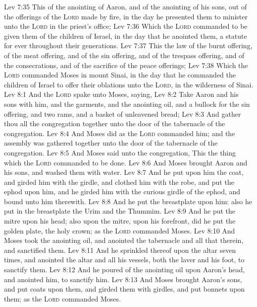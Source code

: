\vs Lev 7:35 This  of the anointing of Aaron, and of the anointing of his sons, out of the offerings of the \textsc{Lord} made by fire, in the day  he presented them to minister unto the \textsc{Lord} in the priest's office;
\vs Lev 7:36 Which the \textsc{Lord} commanded to be given them of the children of Israel, in the day that he anointed them,  a statute for ever throughout their generations.
\vs Lev 7:37 This  the law of the burnt offering, of the meat offering, and of the sin offering, and of the trespass offering, and of the consecrations, and of the sacrifice of the peace offerings;
\vs Lev 7:38 Which the \textsc{Lord} commanded Moses in mount Sinai, in the day that he commanded the children of Israel to offer their oblations unto the \textsc{Lord}, in the wilderness of Sinai.
\vs Lev 8:1 And the \textsc{Lord} spake unto Moses, saying,
\vs Lev 8:2 Take Aaron and his sons with him, and the garments, and the anointing oil, and a bullock for the sin offering, and two rams, and a basket of unleavened bread;
\vs Lev 8:3 And gather thou all the congregation together unto the door of the tabernacle of the congregation.
\vs Lev 8:4 And Moses did as the \textsc{Lord} commanded him; and the assembly was gathered together unto the door of the tabernacle of the congregation.
\vs Lev 8:5 And Moses said unto the congregation, This  the thing which the \textsc{Lord} commanded to be done.
\vs Lev 8:6 And Moses brought Aaron and his sons, and washed them with water.
\vs Lev 8:7 And he put upon him the coat, and girded him with the girdle, and clothed him with the robe, and put the ephod upon him, and he girded him with the curious girdle of the ephod, and bound  unto him therewith.
\vs Lev 8:8 And he put the breastplate upon him: also he put in the breastplate the Urim and the Thummim.
\vs Lev 8:9 And he put the mitre upon his head; also upon the mitre,  upon his forefront, did he put the golden plate, the holy crown; as the \textsc{Lord} commanded Moses.
\vs Lev 8:10 And Moses took the anointing oil, and anointed the tabernacle and all that  therein, and sanctified them.
\vs Lev 8:11 And he sprinkled thereof upon the altar seven times, and anointed the altar and all his vessels, both the laver and his foot, to sanctify them.
\vs Lev 8:12 And he poured of the anointing oil upon Aaron's head, and anointed him, to sanctify him.
\vs Lev 8:13 And Moses brought Aaron's sons, and put coats upon them, and girded them with girdles, and put bonnets upon them; as the \textsc{Lord} commanded Moses.

